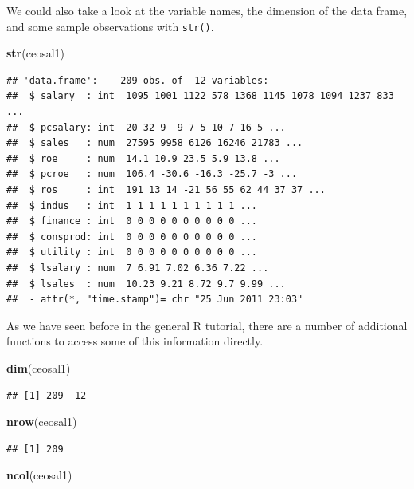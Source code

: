 \documentclass[]{book}
\newenvironment{Shaded}{\begin{snugshade}}{\end{snugshade}}
\newcommand{\KeywordTok}[1]{\textcolor[rgb]{0.13,0.29,0.53}{\textbf{#1}}}
\newcommand{\NormalTok}[1]{#1}
\begin{document}
We could also take a look at the variable names, the dimension of the
data frame, and some sample observations with \texttt{str()}.

\begin{Shaded}
\begin{Highlighting}[]
\KeywordTok{str}\NormalTok{(ceosal1)}
\end{Highlighting}
\end{Shaded}

\begin{verbatim}
## 'data.frame':    209 obs. of  12 variables:
##  $ salary  : int  1095 1001 1122 578 1368 1145 1078 1094 1237 833 ...
##  $ pcsalary: int  20 32 9 -9 7 5 10 7 16 5 ...
##  $ sales   : num  27595 9958 6126 16246 21783 ...
##  $ roe     : num  14.1 10.9 23.5 5.9 13.8 ...
##  $ pcroe   : num  106.4 -30.6 -16.3 -25.7 -3 ...
##  $ ros     : int  191 13 14 -21 56 55 62 44 37 37 ...
##  $ indus   : int  1 1 1 1 1 1 1 1 1 1 ...
##  $ finance : int  0 0 0 0 0 0 0 0 0 0 ...
##  $ consprod: int  0 0 0 0 0 0 0 0 0 0 ...
##  $ utility : int  0 0 0 0 0 0 0 0 0 0 ...
##  $ lsalary : num  7 6.91 7.02 6.36 7.22 ...
##  $ lsales  : num  10.23 9.21 8.72 9.7 9.99 ...
##  - attr(*, "time.stamp")= chr "25 Jun 2011 23:03"
\end{verbatim}

As we have seen before in the general R tutorial, there are a number of
additional functions to access some of this information directly.

\begin{Shaded}
\begin{Highlighting}[]
\KeywordTok{dim}\NormalTok{(ceosal1)}
\end{Highlighting}
\end{Shaded}

\begin{verbatim}
## [1] 209  12
\end{verbatim}

\begin{Shaded}
\begin{Highlighting}[]
\KeywordTok{nrow}\NormalTok{(ceosal1)}
\end{Highlighting}
\end{Shaded}

\begin{verbatim}
## [1] 209
\end{verbatim}

\begin{Shaded}
\begin{Highlighting}[]
\KeywordTok{ncol}\NormalTok{(ceosal1)}
\end{Highlighting}
\end{Shaded}
\end{document}

